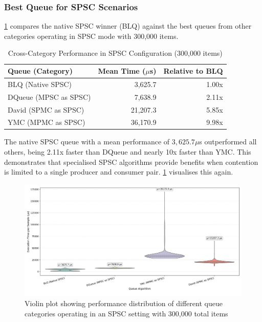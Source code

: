 \subsubsection{Best Queue for \ac{SPSC} Scenarios}
\cref{tab:best-spsc} compares the native \ac{SPSC} winner (\ac{BLQ}) against the best queues from other categories operating in \ac{SPSC} mode with 300,000 items.

\begin{table}[htb]
\centering
\caption{Cross-Category Performance in \ac{SPSC} Configuration (300,000 items)}
\label{tab:best-spsc}
\begin{tabular}{@{}lrr@{}}
\toprule
Queue (Category) & Mean Time ($\mu$s) & Relative to \ac{BLQ} \\
\midrule
\ac{BLQ} (Native SPSC) & 3,625.7 & 1.00x \\
DQueue (MPSC as SPSC) & 7,638.9 & 2.11x \\
David (SPMC as SPSC) & 21,207.3 & 5.85x \\
\ac{YMC} (MPMC as SPSC) & 36,170.9 & 9.98x \\
\bottomrule
\end{tabular}
\end{table}

The native \ac{SPSC} queue with a mean performance of $3,625.7\mu$s outperformed all others, being 2.11x faster than DQueue and nearly 10x faster than \ac{YMC}. This demonstrates that specialised \ac{SPSC} algorithms provide benefits when contention is limited to a single producer and consumer pair. \cref{fig:cross-spsc-violin} visualises this again.

\begin{figure}[htb]
\centering
\caption{Violin plot showing performance distribution of different queue categories operating in an \ac{SPSC} setting with 300,000 total items}
\label{fig:cross-spsc-violin}
\includegraphics[width=\textwidth]{images/results/best_algorithms_in_spsc_performance.png}
\end{figure}

